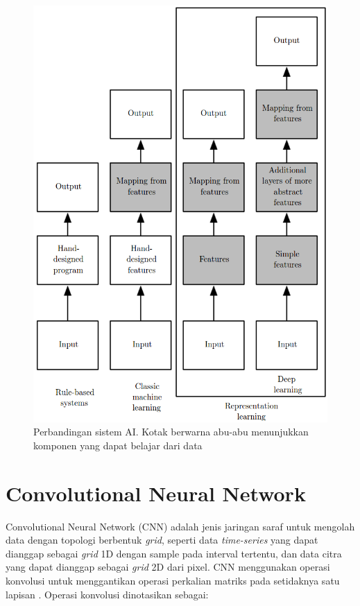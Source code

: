 \begin{figure}
    \centering
    \includegraphics[width=12cm]{gambar/landasan-teori/perbandingan-ai.png}
    \caption{Perbandingan sistem AI. Kotak berwarna abu-abu menunjukkan komponen yang dapat belajar dari data \citep{goodfellow-2016}}
    \label{gambar:perbandingan-ai}
\end{figure}


%
%
\section{Convolutional Neural Network}
Convolutional Neural Network (CNN) adalah jenis jaringan saraf untuk mengolah data dengan topologi berbentuk \textit{grid}, seperti data \textit{time-series} yang dapat dianggap sebagai \textit{grid} 1D dengan sample pada interval tertentu, dan data citra yang dapat dianggap sebagai \textit{grid} 2D dari pixel. CNN menggunakan operasi konvolusi untuk menggantikan operasi perkalian matriks pada setidaknya satu lapisan \citep{goodfellow-2016}. Operasi konvolusi dinotasikan sebagai:

